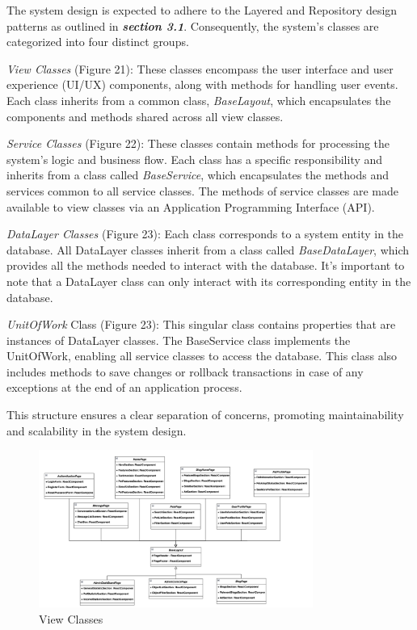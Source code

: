 The system design is expected to adhere to the Layered and Repository
design patterns as outlined in \emph{\textbf{section 3.1}}.
Consequently, the system's classes are categorized into four distinct
groups.

\emph{View Classes} (Figure 21): These classes encompass the user
interface and user experience (UI/UX) components, along with methods for
handling user events. Each class inherits from a common class,
\emph{BaseLayout}, which encapsulates the components and methods shared
across all view classes.

\emph{Service Classes} (Figure 22): These classes contain methods for
processing the system's logic and business flow. Each class has a
specific responsibility and inherits from a class called
\emph{BaseService}, which encapsulates the methods and services common
to all service classes. The methods of service classes are made
available to view classes via an Application Programming Interface
(API).

\emph{DataLayer Classes} (Figure 23): Each class corresponds to a system
entity in the database. All DataLayer classes inherit from a class
called \emph{BaseDataLayer}, which provides all the methods needed to
interact with the database. It's important to note that a DataLayer
class can only interact with its corresponding entity in the database.

\emph{UnitOfWork} Class (Figure 23): This singular class contains
properties that are instances of DataLayer classes. The BaseService
class implements the UnitOfWork, enabling all service classes to access
the database. This class also includes methods to save changes or
rollback transactions in case of any exceptions at the end of an
application process.

This structure ensures a clear separation of concerns, promoting
maintainability and scalability in the system design.

\begin{figure}[H]
  \centering
  \includegraphics[angle=-90,width=0.8\textwidth]{Figures/view_class.png}
  \caption{View Classes}
  \label{fig:view-classes}
\end{figure}
\clearpage

